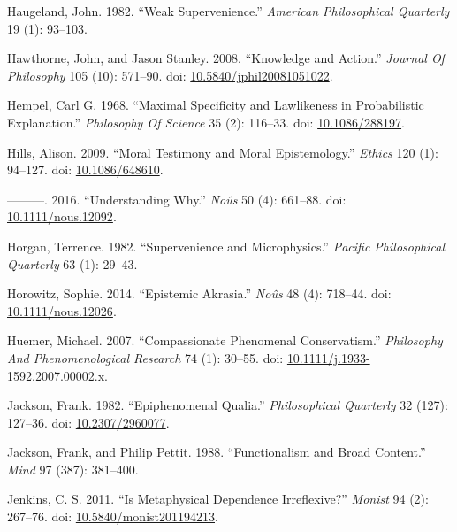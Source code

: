 \documentclass[
  10pt,
  letterpaper,
  DIV=11,
  numbers=noendperiod,
  twoside]{scrartcl}
\newlength{\cslhangindent}
\newenvironment{CSLReferences}[2] %
 {\begin{list}{}{%
  \setlength{\itemindent}{0pt}
  \setlength{\leftmargin}{0pt}
  \setlength{\parsep}{0pt}
  \ifodd #1
   \setlength{\leftmargin}{\cslhangindent}
   \setlength{\itemindent}{-1\cslhangindent}
  \fi
  \setlength{\itemsep}{#2\baselineskip}}}
 {\end{list}}
\begin{document}
\begin{CSLReferences}{1}{0}
Haugeland, John. 1982. {``Weak Supervenience.''} \emph{American
Philosophical Quarterly} 19 (1): 93--103.

Hawthorne, John, and Jason Stanley. 2008. {``Knowledge and Action.''}
\emph{Journal Of Philosophy} 105 (10): 571--90. doi:
\href{https://doi.org/10.5840/jphil20081051022}{10.5840/jphil20081051022}.

Hempel, Carl G. 1968. {``Maximal Specificity and Lawlikeness in
Probabilistic Explanation.''} \emph{Philosophy Of Science} 35 (2):
116--33. doi: \href{https://doi.org/10.1086/288197}{10.1086/288197}.

Hills, Alison. 2009. {``Moral Testimony and Moral Epistemology.''}
\emph{Ethics} 120 (1): 94--127. doi:
\href{https://doi.org/10.1086/648610}{10.1086/648610}.

---------. 2016. {``Understanding Why.''} \emph{Noûs} 50 (4): 661--88.
doi: \href{https://doi.org/10.1111/nous.12092}{10.1111/nous.12092}.

Horgan, Terrence. 1982. {``Supervenience and Microphysics.''}
\emph{Pacific Philosophical Quarterly} 63 (1): 29--43.

Horowitz, Sophie. 2014. {``Epistemic Akrasia.''} \emph{Noûs} 48 (4):
718--44. doi:
\href{https://doi.org/10.1111/nous.12026}{10.1111/nous.12026}.

Huemer, Michael. 2007. {``Compassionate Phenomenal Conservatism.''}
\emph{Philosophy And Phenomenological Research} 74 (1): 30--55. doi:
\href{https://doi.org/10.1111/j.1933-1592.2007.00002.x}{10.1111/j.1933-1592.2007.00002.x}.

Jackson, Frank. 1982. {``Epiphenomenal Qualia.''} \emph{Philosophical
Quarterly} 32 (127): 127--36. doi:
\href{https://doi.org/10.2307/2960077}{10.2307/2960077}.

Jackson, Frank, and Philip Pettit. 1988. {``Functionalism and Broad
Content.''} \emph{Mind} 97 (387): 381--400.

Jenkins, C. S. 2011. {``Is Metaphysical Dependence Irreflexive?''}
\emph{Monist} 94 (2): 267--76. doi:
\href{https://doi.org/10.5840/monist201194213}{10.5840/monist201194213}.


\end{CSLReferences}
\end{document}
